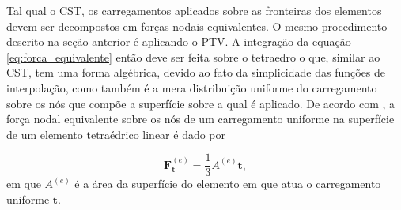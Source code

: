 Tal qual o CST, os carregamentos aplicados sobre as fronteiras dos elementos devem ser decompostos em forças nodais equivalentes. O mesmo procedimento descrito na seção anterior é aplicando o PTV. A integração da equação \ref{eq:forca_equivalente} então deve ser feita sobre o tetraedro o que, similar ao CST, tem uma forma algébrica, devido ao fato da simplicidade das funções de interpolação, como também é a mera distribuição uniforme do carregamento sobre os nós que compõe a superfície sobre a qual é aplicado. De acordo com , a força nodal equivalente sobre os nós de um carregamento uniforme na superfície de um elemento tetraédrico linear é dado por

\begin{equation}
    \bm{F}^{(e)}_{\bm{t}} = \frac{1}{3} A^{(e)} \bm{t},
\end{equation}
em que $A^{(e)}$ é a área da superfície do elemento em que atua o carregamento uniforme $\bm{t}$.
